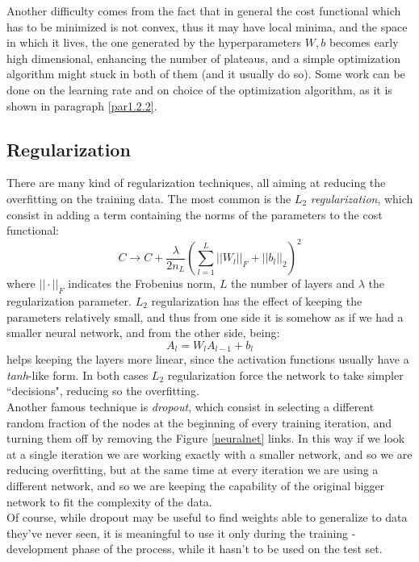 \documentclass[12pt, a4paper]{report}
\theoremstyle{definition}
\begin{document}
\noindent Another difficulty comes from the fact that in general the cost functional which has to be minimized is not convex, thus it may have local minima, and the space in which it lives, the one generated by the hyperparameters $W,b$ becomes early high dimensional, enhancing the number of plateaus, and a simple optimization algorithm might stuck in both of them (and it usually do so). Some work can be done on the learning rate and on choice of the optimization algorithm, as it is shown in paragraph \ref{par1.2.2}.\\

\subsection{Regularization}\label{par1.2.1}
There are many kind of regularization techniques, all aiming at reducing the overfitting on the training data. The most common is the $L_2$ \textit{regularization}, which consist in adding a term containing the norms of the parameters to the cost functional:
\[
C \longrightarrow C + \frac{\lambda}{2n_L}\left( \sum_{l=1}^{L}||W_l||_F + ||b_l||_2 \right)^2
\]
where $||\cdot||_F$ indicates the Frobenius norm, $L$ the number of layers and  $\lambda$ the regularization parameter. $L_2$ regularization has the effect of keeping the parameters relatively small, and thus from one side it is somehow as if we had a smaller neural network, and from the other side, being:
\[
A_l=W_lA_{l-1}+b_l
\]
helps keeping the layers more linear, since the activation functions usually have a \textit{tanh}-like form. In both cases $L_2$ regularization force the network to take simpler ``decisions", reducing so the overfitting.\\
Another famous technique is \textit{dropout}, which consist in selecting a different random fraction of the nodes at the beginning of every training iteration, and turning them off by removing the Figure \ref{neuralnet} links. In this way if we look at a single iteration we are working exactly with a smaller network, and so we are reducing overfitting, but at the same time at every iteration we are using a different network, and so we are keeping the capability of the original bigger network to fit the complexity of the data.\\
Of course, while dropout may be useful to find weights able to generalize to data they've never seen, it is meaningful to use it only during the training - development phase of the process, while it hasn't to be used on the test set.
\end{document}
